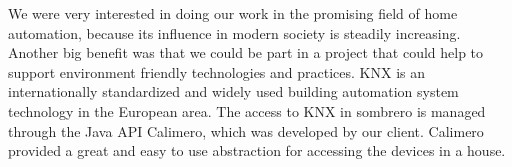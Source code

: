 We were very interested in doing our work in the promising field of home automation, because its influence in modern society is steadily increasing. Another big benefit was that we could be part in a project that could help to support environment friendly technologies and practices. KNX is an internationally standardized and widely used building automation system technology in the European area. The access to KNX in sombrero is managed through the Java API Calimero, which was developed by our client. Calimero provided a great and easy to use abstraction for accessing the devices in a house. 